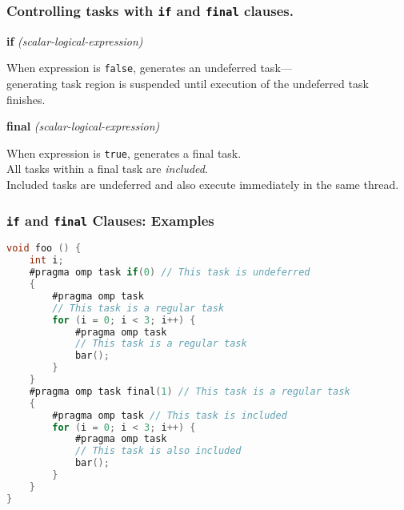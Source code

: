 \begin{frame}
  \frametitle{Controlling tasks with {\tt if} and {\tt final} clauses.}

\large
  \begin{changemargin}{1cm}
  \begin{center}
  {\bf if} {\it(scalar-logical-expression)}
  \end{center}

    When expression is {\tt false}, generates an undeferred task---\\
    generating task region is suspended until execution of the
      undeferred task finishes.\\[1em]

  \begin{center}
  {\bf final} {\it(scalar-logical-expression)}
  \end{center}

    When expression is {\tt true}, generates a final task.\\
    All tasks within a final task are {\it included}.\\
    Included tasks are undeferred and also execute immediately in the same thread.
  \end{changemargin}
\end{frame}

\begin{frame}[fragile]
  \frametitle{{\tt if} and {\tt final} Clauses: Examples}

  \begin{lstlisting}[language=C,morekeywords={foreach,pragma,omp,parallel,single,nowait,task,untied,barrier,taskyield,mergeable,final,taskwait,critical}]
void foo () {
    int i;
    #pragma omp task if(0) // This task is undeferred
    {
        #pragma omp task
        // This task is a regular task
        for (i = 0; i < 3; i++) {
            #pragma omp task
            // This task is a regular task
            bar();
        }
    }
    #pragma omp task final(1) // This task is a regular task
    {
        #pragma omp task // This task is included
        for (i = 0; i < 3; i++) {
            #pragma omp task
            // This task is also included
            bar();
        }
    }
}
  \end{lstlisting}
\end{frame}

